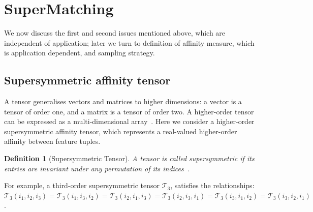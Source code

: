 \section{SuperMatching}
\label{sec:supersymhopm}
We now discuss the first and second issues mentioned above, which are independent of application; later we turn to definition of affinity measure, which is application dependent, and sampling strategy.

\subsection{Supersymmetric affinity tensor}
\label{subsec:supersymtensor}

A tensor generalises vectors and matrices to higher dimensions: a vector is a tensor of order one,
and a matrix is a tensor of order two. A higher-order tensor can be expressed as a multi-dimensional array~\cite{Kolda08}.
Here we consider a higher-order supersymmetric affinity tensor, which represents a real-valued higher-order affinity between feature tuples.

\newtheorem{mot}{Definition}
\begin{mot}[Supersymmetric Tensor]
\label{mot:def1}
A tensor is called supersymmetric if its entries are invariant under any permutation of its indices~\cite{Kofidis02}.
\end{mot}

For example, a third-order supersymmetric tensor $\mathcal{T}_3$, satisfies the relationships:
$\mathcal{T}_3(i_1, i_2, i_3)=\mathcal{T}_3(i_1, i_3, i_2)=\mathcal{T}_3(i_2, i_1, i_3)=\mathcal{T}_3(i_2, i_3, i_1)=\mathcal{T}_3(i_3, i_1, i_2)=\mathcal{T}_3(i_3, i_2, i_1)$.

